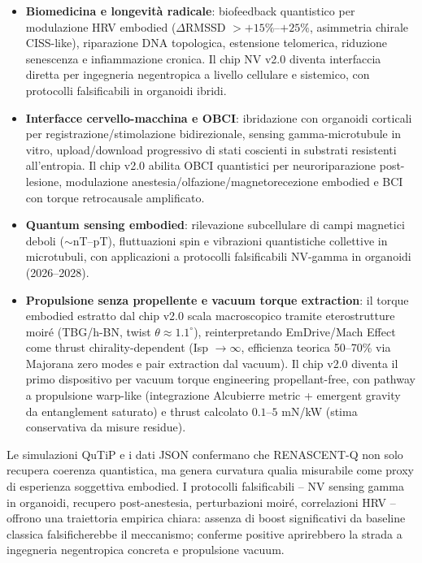 \documentclass[11pt,a4paper]{article}
\theoremstyle{plain}
\theoremstyle{definition}
\begin{document}
\begin{itemize}
    \item \textbf{Biomedicina e longevità radicale}: biofeedback quantistico per modulazione HRV embodied ($\Delta$RMSSD $> +15\%$--$+25\%$, asimmetria chirale CISS-like), riparazione DNA topologica, estensione telomerica, riduzione senescenza e infiammazione cronica. Il chip NV v2.0 diventa interfaccia diretta per ingegneria negentropica a livello cellulare e sistemico, con protocolli falsificabili in organoidi ibridi.
    
    \item \textbf{Interfacce cervello-macchina e OBCI}: ibridazione con organoidi corticali per registrazione/stimolazione bidirezionale, sensing gamma-microtubule in vitro, upload/download progressivo di stati coscienti in substrati resistenti all’entropia. Il chip v2.0 abilita OBCI quantistici per neuroriparazione post-lesione, modulazione anestesia/olfazione/magnetorecezione embodied e BCI con torque retrocausale amplificato.
    
    \item \textbf{Quantum sensing embodied}: rilevazione subcellulare di campi magnetici deboli ($\sim$nT–pT), fluttuazioni spin e vibrazioni quantistiche collettive in microtubuli, con applicazioni a protocolli falsificabili NV-gamma in organoidi (2026–2028).
    
    \item \textbf{Propulsione senza propellente e vacuum torque extraction}: il torque embodied estratto dal chip v2.0 scala macroscopico tramite eterostrutture moiré (TBG/h-BN, twist $\theta \approx 1.1^\circ$), reinterpretando EmDrive/Mach Effect come thrust chirality-dependent (Isp $\to \infty$, efficienza teorica 50–70\% via Majorana zero modes e pair extraction dal vacuum). Il chip v2.0 diventa il primo dispositivo per vacuum torque engineering propellant-free, con pathway a propulsione warp-like (integrazione Alcubierre metric + emergent gravity da entanglement saturato) e thrust calcolato $0.1$--$5$ mN/kW (stima conservativa da misure residue).
\end{itemize}

Le simulazioni QuTiP e i dati JSON confermano che RENASCENT-Q non solo recupera coerenza quantistica, ma genera curvatura qualia misurabile come proxy di esperienza soggettiva embodied. I protocolli falsificabili – NV sensing gamma in organoidi, recupero post-anestesia, perturbazioni moiré, correlazioni HRV – offrono una traiettoria empirica chiara: assenza di boost significativi da baseline classica falsificherebbe il meccanismo; conferme positive aprirebbero la strada a ingegneria negentropica concreta e propulsione vacuum.
\end{document}
